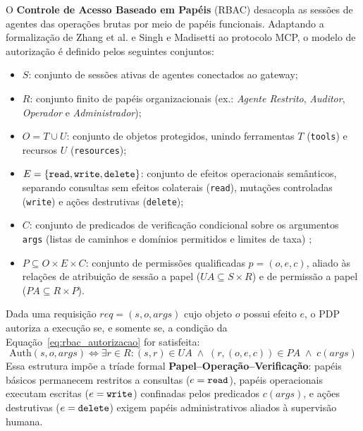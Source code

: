 O \textbf{Controle de Acesso Baseado em Papéis} (RBAC) desacopla as sessões de agentes das operações brutas por meio de papéis funcionais. Adaptando a formalização de Zhang et al. \cite{zhang2025acfix} e Singh e Madisetti \cite{singh2026mcpsecure} ao protocolo MCP, o modelo de autorização é definido pelos seguintes conjuntos:
\begin{itemize}
  \item $S$: conjunto de sessões ativas de agentes conectados ao gateway;
  \item $R$: conjunto finito de papéis organizacionais (ex.: \textit{Agente Restrito}, \textit{Auditor}, \textit{Operador} e \textit{Administrador});
  \item $O = T \cup U$: conjunto de objetos protegidos, unindo ferramentas $T$ (\texttt{tools}) e recursos $U$ (\texttt{resources});
  \item $E = \{\text{\texttt{read}}, \text{\texttt{write}}, \text{\texttt{delete}}\}$: conjunto de efeitos operacionais semânticos, separando consultas sem efeitos colaterais (\texttt{read}), mutações controladas (\texttt{write}) e ações destrutivas (\texttt{delete});
  \item $C$: conjunto de predicados de verificação condicional sobre os argumentos \texttt{args} (listas de caminhos e domínios permitidos e limites de taxa) \cite{buhler2026agentbound};
  \item $P \subseteq O \times E \times C$: conjunto de permissões qualificadas $p = (o, e, c)$, aliado às relações de atribuição de sessão a papel ($UA \subseteq S \times R$) e de permissão a papel ($PA \subseteq R \times P$).
\end{itemize}

Dada uma requisição $req = (s, o, args)$ cujo objeto $o$ possui efeito $e$, o PDP autoriza a execução se, e somente se, a condição da Equação~\ref{eq:rbac_autorizacao} for satisfeita:
\begin{equation}
  \text{Auth}(s, o, args) \iff \exists r \in R : (s, r) \in UA \;\wedge\; (r, (o, e, c)) \in PA \;\wedge\; c(args)
  \label{eq:rbac_autorizacao}
\end{equation}
Essa estrutura impõe a tríade formal \textbf{Papel--Operação--Verificação}: papéis básicos permanecem restritos a consultas ($e = \text{\texttt{read}}$), papéis operacionais executam escritas ($e = \text{\texttt{write}}$) confinadas pelos predicados $c(args)$, e ações destrutivas ($e = \text{\texttt{delete}}$) exigem papéis administrativos aliados à supervisão humana.

